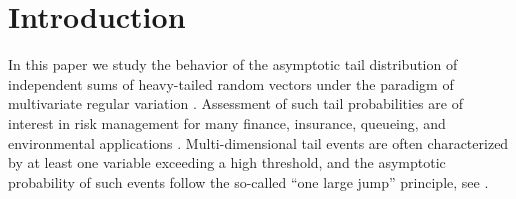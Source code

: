 \documentclass[aos]{imsart}
\numberwithin{equation}{section}
\theoremstyle{plain} %
\theoremstyle{remark}
\begin{document}
\begin{frontmatter}
\begin{abstract}
\end{abstract}


\begin{keyword}[class=MSC]
\end{keyword}

\begin{keyword}
\end{keyword}


\end{frontmatter}



\section{Introduction}\label{sec:intro}


In this paper we study the behavior of the asymptotic tail distribution of independent sums of heavy-tailed random vectors under the paradigm of multivariate regular variation \citep{bingham:goldie:teugels:1989, resnickbook:2007}. Assessment of such tail probabilities  are of interest in risk management for many finance, insurance, queueing, and environmental applications \citep{McNeil:Frey:Embrechts,embrechts:kluppelberg:mikosch:1997,asmussen:2003}. %
Multi-dimensional tail events are often characterized by at least one variable exceeding a high threshold, and the asymptotic probability of such events follow the so-called ``one large jump'' principle, see \cite{hult:lindskog:2006b}. 
\end{document}
